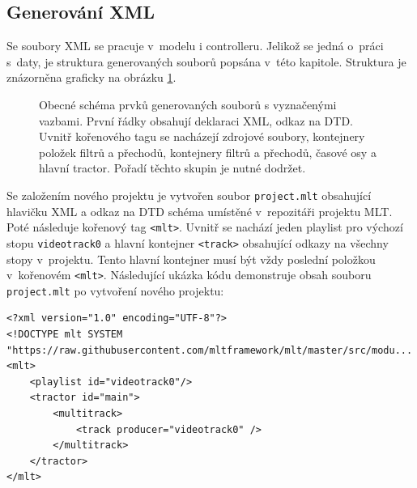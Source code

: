 \subsection{Generování XML}
Se soubory XML se pracuje v~modelu i controlleru. Jelikož se jedná o~práci s~daty, je struktura generovaných souborů popsána v~této kapitole. Struktura je znázorněna graficky na obrázku \ref{img:schemaXML}.
\begin{figure}[h]
	\centering
	\caption{Obecné schéma prvků generovaných souborů s vyznačenými vazbami. První řádky obsahují deklaraci XML, odkaz na DTD. Uvnitř kořenového tagu se nacházejí zdrojové soubory, kontejnery položek filtrů a přechodů, kontejnery filtrů a přechodů, časové osy a hlavní tractor. Pořadí těchto skupin je nutné dodržet.}\label{img:schemaXML}
\end{figure}

Se založením nového projektu je vytvořen soubor \texttt{project.mlt} obsahující hlavičku XML a odkaz na DTD schéma umístěné v~repozitáři projektu MLT. Poté následuje kořenový tag \texttt{<mlt>}. Uvnitř se nachází jeden playlist pro výchozí stopu \texttt{videotrack0} a hlavní kontejner \texttt{<track>} obsahující odkazy na všechny stopy v~projektu. Tento hlavní kontejner musí být vždy poslední položkou v~kořenovém \texttt{<mlt>}. Následující ukázka kódu demonstruje obsah souboru \texttt{project.mlt} po vytvoření nového projektu:
\begin{lstlisting}[style=xml]
<?xml version="1.0" encoding="UTF-8"?>
<!DOCTYPE mlt SYSTEM "https://raw.githubusercontent.com/mltframework/mlt/master/src/modu...
<mlt>
    <playlist id="videotrack0"/>
    <tractor id="main">
        <multitrack>
            <track producer="videotrack0" />
        </multitrack>
    </tractor>
</mlt>
\end{lstlisting}


